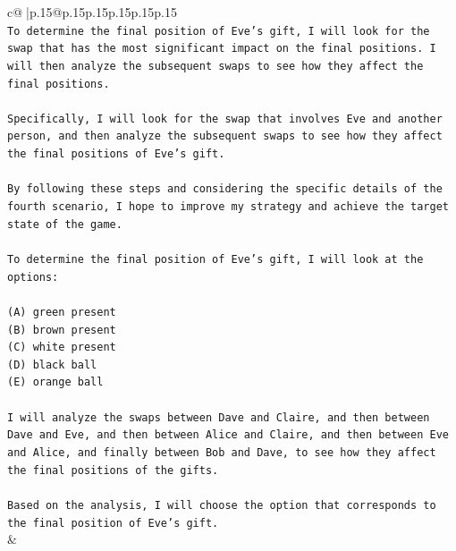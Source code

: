 \documentclass{article}
\begin{document}
{\begin{supertabular}{c@{$\;$}|p{.15\linewidth}@{}p{.15\linewidth}p{.15\linewidth}p{.15\linewidth}p{.15\linewidth}p{.15\linewidth}}
{{{\\ 
\texttt{To determine the final position of Eve's gift, I will look for the swap that has the most significant impact on the final positions. I will then analyze the subsequent swaps to see how they affect the final positions.} \\
\\ 
\texttt{Specifically, I will look for the swap that involves Eve and another person, and then analyze the subsequent swaps to see how they affect the final positions of Eve's gift.} \\
\\ 
\texttt{By following these steps and considering the specific details of the fourth scenario, I hope to improve my strategy and achieve the target state of the game.} \\
\\ 
\texttt{To determine the final position of Eve's gift, I will look at the options:} \\
\\ 
\texttt{(A) green present} \\
\texttt{(B) brown present} \\
\texttt{(C) white present} \\
\texttt{(D) black ball} \\
\texttt{(E) orange ball} \\
\\ 
\texttt{I will analyze the swaps between Dave and Claire, and then between Dave and Eve, and then between Alice and Claire, and then between Eve and Alice, and finally between Bob and Dave, to see how they affect the final positions of the gifts.} \\
\\ 
\texttt{Based on the analysis, I will choose the option that corresponds to the final position of Eve's gift.} \\
            }
        }
    }
    & \\ \\

\end{supertabular}
}
\end{document}
